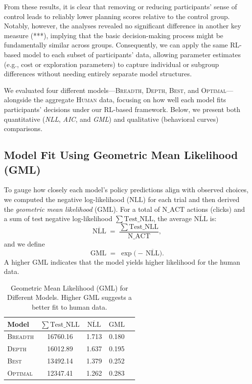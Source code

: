 \documentclass[a4paper,12pt,oneside,article]{memoir}
\begin{document}
From these results, it is clear that removing or reducing participants’ sense of control leads to reliably lower planning scores relative to the control group. Notably, however, the analyses revealed no significant difference in another key measure (***), implying that the basic decision-making process might be fundamentally similar across groups. Consequently, we can apply the same RL-based model to each subset of participants’ data, allowing parameter estimates (e.g., cost or exploration parameters) to capture individual or subgroup differences without needing entirely separate model structures.

We evaluated four different models---\textsc{Breadth}, \textsc{Depth}, \textsc{Best}, and \textsc{Optimal}---alongside the aggregate \textsc{Human} data, focusing on how well each model fits participants’ decisions under our RL-based framework. Below, we present both quantitative (\emph{NLL}, \emph{AIC}, and \emph{GML}) and qualitative (behavioral curves) comparisons. 

\subsection*{Model Fit Using Geometric Mean Likelihood (GML)}
\label{sec:gml}
To gauge how closely each model’s policy predictions align with observed choices, we computed the negative log-likelihood (\(\mathrm{NLL}\)) for each trial and then derived the \textit{geometric mean likelihood} (\(\mathrm{GML}\)). For a total of \(\mathrm{N\_ACT}\) actions (clicks) and a sum of test negative log-likelihood \(\sum \mathrm{Test\_NLL}\), the average \(\overline{\mathrm{NLL}}\) is:
\[
  \overline{\mathrm{NLL}} \;=\; \frac{\sum \mathrm{Test\_NLL}}{\mathrm{N\_ACT}},
\]
and we define
\[
  \mathrm{GML} \;=\; \exp\bigl(-\,\overline{\mathrm{NLL}}\bigr).
\]
A higher GML indicates that the model yields higher likelihood for the human data.

\begin{table}[h]
    \centering
    \begin{tabular}{lcccc}
    \toprule
    \textbf{Model}
      & \(\sum \mathrm{Test\_NLL}\) 
      & \(\overline{\mathrm{NLL}}\) 
      & \(\mathrm{GML}\) \\
    \midrule
    \textsc{Breadth} & 16760.16 & 1.713 & 0.180 \\
    \textsc{Depth}   & 16012.89 & 1.637 & 0.195 \\
    \textsc{Best}    & 13492.14 & 1.379 & 0.252 \\
    \textsc{Optimal} & 12347.41 & 1.262 & 0.283 \\
    \bottomrule
    \end{tabular}
    \caption{Geometric Mean Likelihood (GML) for Different Models. Higher GML suggests a better fit to human data.}
    \label{tab:gml}
\end{table}
\end{document}
